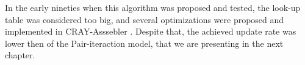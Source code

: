 In the early nineties when this algorithm was proposed and tested, the look-up table was considered too big, and several optimizations were proposed and implemented in CRAY-Asssebler \cite{wolf}. Despite that, the achieved update rate was lower then of the Pair-iteraction model, that we are presenting in the next chapter. 

